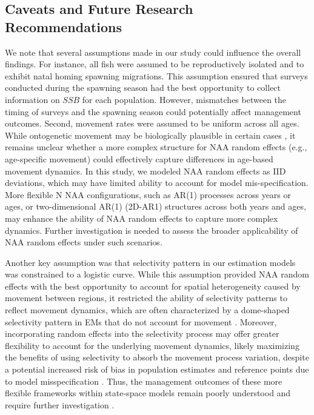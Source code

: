 \documentclass[
  12pt,
]{article}
\begin{document}
\hypertarget{caveats-and-future-research-recommendations}{%
\subsection{Caveats and Future Research
Recommendations}\label{caveats-and-future-research-recommendations}}

We note that several assumptions made in our study could influence the
overall findings. For instance, all fish were assumed to be
reproductively isolated and to exhibit natal homing spawning migrations.
This assumption ensured that surveys conducted during the spawning
season had the best opportunity to collect information on \(SSB\) for
each population. However, mismatches between the timing of surveys and
the spawning season could potentially affect management outcomes.
Second, movement rates were assumed to be uniform across all ages. While
ontogenetic movement may be biologically plausible in certain cases
\citep{Waterhouse2014, Hanselman2015}, it remains unclear whether a more
complex structure for NAA random effects (e.g., age-specific movement)
could effectively capture differences in age-based movement dynamics. In
this study, we modeled NAA random effects as IID deviations, which may
have limited ability to account for model mis-specification. More
flexible N NAA configurations, such as AR(1) processes across years or
ages, or two-dimensional AR(1) (2D-AR1) structures across both years and
ages, may enhance the ability of NAA random effects to capture more
complex dynamics. Further investigation is needed to assess the broader
applicability of NAA random effects under such scenarios.

Another key assumption was that selectivity pattern in our estimation
models was constrained to a logistic curve. While this assumption
provided NAA random effects with the best opportunity to account for
spatial heterogeneity caused by movement between regions, it restricted
the ability of selectivity patterns to reflect movement dynamics, which
are often characterized by a dome-shaped selectivity pattern in EMs that
do not account for movement \citep{O'Boyle2016}. Moreover, incorporating
random effects into the selectivity process may offer greater
flexibility to account for the underlying movement dynamics, likely
maximizing the benefits of using selectivity to absorb the movement
process variation, despite a potential increased risk of bias in
population estimates and reference points due to model misspecification
\citep{Fisch2023, Li2024}. Thus, the management outcomes of these more
flexible frameworks within state-space models remain poorly understood
and require further investigation \citep{O'Boyle2016}.
\end{document}
